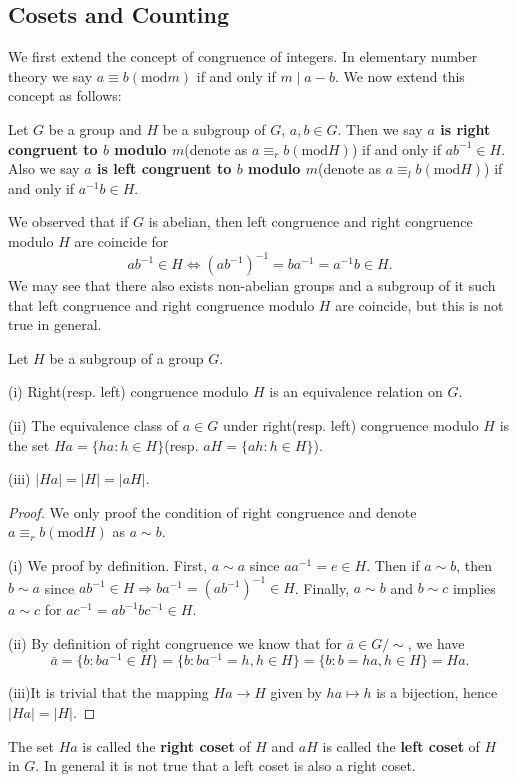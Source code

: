 \subsection{Cosets and Counting}
We first extend the concept of congruence of integers. In elementary number theory we say $a\equiv b(\mathrm{mod}m)$ if and only if $m\mid a-b$. We now extend this concept as follows:
\begin{definition}
Let $G$ be a group and $H$ be a subgroup of $G$, $a,b\in G$. Then we say \textbf{$a$ is right congruent to $b$ modulo $m$}(denote as $a\equiv_rb(\mathrm{mod}H)$) if and only if $ab^{-1}\in H$. Also we say \textbf{$a$ is left congruent to $b$ modulo $m$}(denote as $a\equiv_lb(\mathrm{mod}H)$) if and only if $a^{-1}b\in H$.
\end{definition}
We observed that if $G$ is abelian, then left congruence and right congruence modulo $H$ are coincide for 
$$
ab^{-1}\in H\Leftrightarrow \left( ab^{-1} \right) ^{-1}=ba^{-1}=a^{-1}b\in H.
$$
We may see that there also exists non-abelian groups and a subgroup of it such that left congruence and right congruence modulo $H$ are coincide, but this is not true in general.
\begin{theorem}
Let $H$ be a subgroup of a group $G$.\par
(i) Right(resp. left) congruence modulo $H$ is an equivalence relation on $G$.\par
(ii) The equivalence class of $a\in G$ under right(resp. left) congruence modulo $H$ is the set $Ha=\{ha:h\in H\}$(resp. $aH=\{ah:h\in H\}$).\par
(iii) $|Ha|=|H|=|aH|$.
\end{theorem}
\begin{proof}
We only proof the condition of right congruence and denote $a\equiv_rb(\mathrm{mod}H)$ as $a\sim b$.\par
(i) We proof by definition. First, $a\sim a$ since $aa^{-1}=e\in H$. Then if $a\sim b$, then $b\sim a$ since $ab^{-1}\in H\Rightarrow ba^{-1}=(ab^{-1})^{-1}\in H$. Finally, $a\sim b$ and $b\sim c$ implies $a\sim c$ for $ac^{-1}=ab^{-1}bc^{-1}\in H$.\par
(ii) By definition of right congruence we know that for $\overline{a}\in G/\sim$, we have 
$$\overline{a}=\{b:ba^{-1}\in H\}=\{b:ba^{-1}=h,h\in H\}=\{b:b=ha,h\in H\}=Ha.$$\par
(iii)It is trivial that the mapping $Ha\to H$ given by $ha\mapsto h$ is a bijection, hence $|Ha|=|H|$.
\end{proof}
The set $Ha$ is called the \textbf{right coset} of $H$ and $aH$ is called the \textbf{left coset} of $H$ in $G$. In general it is not true that a left coset is also a right coset.
